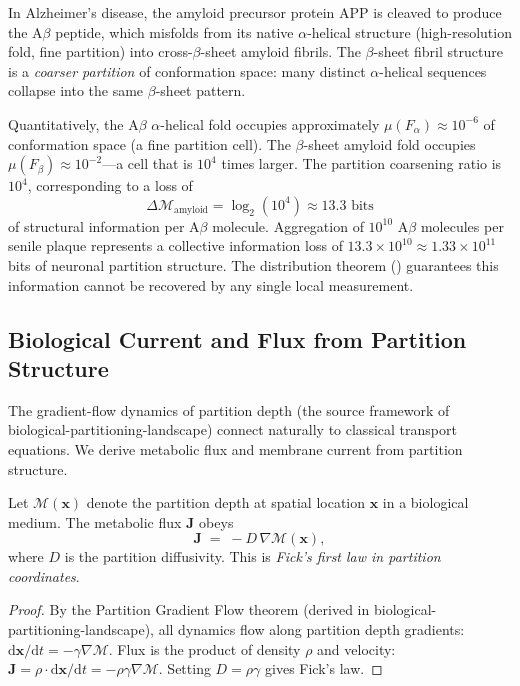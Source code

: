 \begin{example}
\label{ex:ch02-amyloid}
In Alzheimer's disease, the amyloid precursor protein APP is cleaved to produce
the A$\beta$ peptide, which misfolds from its native $\alpha$-helical structure
(high-resolution fold, fine partition) into cross-$\beta$-sheet amyloid fibrils.
The $\beta$-sheet fibril structure is a \emph{coarser partition} of conformation
space: many distinct $\alpha$-helical sequences collapse into the same
$\beta$-sheet pattern.

Quantitatively, the A$\beta$ $\alpha$-helical fold occupies approximately
$\mu(F_\alpha) \approx 10^{-6}$ of conformation space (a fine partition cell).
The $\beta$-sheet amyloid fold occupies $\mu(F_\beta) \approx 10^{-2}$---a
cell that is $10^4$ times larger.  The partition coarsening ratio is $10^4$,
corresponding to a loss of
\[
  \Delta\mathcal{M}_{\mathrm{amyloid}}
  = \log_2(10^4) \approx 13.3 \text{ bits}
\]
of structural information per A$\beta$ molecule.  Aggregation of $10^{10}$
A$\beta$ molecules per senile plaque represents a collective information loss
of $13.3 \times 10^{10} \approx 1.33 \times 10^{11}$ bits of neuronal
partition structure.  The distribution theorem ()
guarantees this information cannot be recovered by any single local measurement.
\end{example}

\subsection{Biological Current and Flux from Partition Structure}

The gradient-flow dynamics of partition depth (\cf the source framework of
biological-partitioning-landscape) connect naturally to classical transport
equations.  We derive metabolic flux and membrane current from partition
structure.

\begin{theorem}
\label{thm:ch02-fick}
Let $\mathcal{M}(\mathbf{x})$ denote the partition depth at spatial location
$\mathbf{x}$ in a biological medium.  The metabolic flux
$\mathbf{J}$ obeys
\[
  \mathbf{J} \;=\; -D\,\nabla \mathcal{M}(\mathbf{x}),
\]
where $D$ is the partition diffusivity.  This is \emph{Fick's first law
in partition coordinates}.
\end{theorem}

\begin{proof}
By the Partition Gradient Flow theorem (derived in
biological-partitioning-landscape), all dynamics flow along partition depth
gradients: $\mathrm{d}\mathbf{x}/\mathrm{d}t = -\gamma \nabla\mathcal{M}$.
Flux is the product of density $\rho$ and velocity:
$\mathbf{J} = \rho \cdot \mathrm{d}\mathbf{x}/\mathrm{d}t = -\rho\gamma
\nabla\mathcal{M}$.  Setting $D = \rho\gamma$ gives Fick's law.
\end{proof}

